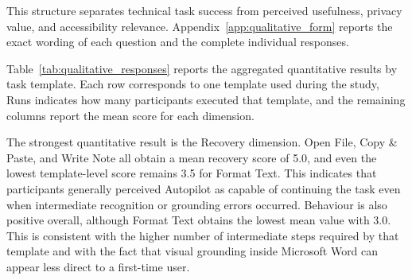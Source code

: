This structure separates technical task success from perceived usefulness, privacy value, and accessibility relevance. Appendix~\ref{app:qualitative_form} reports the exact wording of each question and the complete individual responses.

Table~\ref{tab:qualitative_responses} reports the aggregated quantitative results by task template. Each row corresponds to one template used during the study, Runs indicates how many participants executed that template, and the remaining columns report the mean score for each dimension.

\begin{table}[H]
\centering
\small
\setlength{\tabcolsep}{4pt}
\renewcommand{\arraystretch}{1.1}
\caption{Quantitative user evaluation results by task template.}
\label{tab:qualitative_responses}
\end{table}

The strongest quantitative result is the Recovery dimension. Open File, Copy \& Paste, and Write Note all obtain a mean recovery score of 5.0, and even the lowest template-level score remains 3.5 for Format Text. This indicates that participants generally perceived Autopilot as capable of continuing the task even when intermediate recognition or grounding errors occurred. Behaviour is also positive overall, although Format Text obtains the lowest mean value with 3.0. This is consistent with the higher number of intermediate steps required by that template and with the fact that visual grounding inside Microsoft Word can appear less direct to a first-time user.

